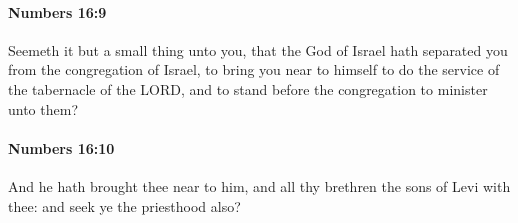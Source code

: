 		\paragraph{Numbers 16:9} %
			\label{NUMBERS-16-9}

			Seemeth it but a small thing unto you, that the God of Israel hath separated you from the congregation of Israel, to bring you near to himself to do the service of the tabernacle of the LORD, and to stand before the congregation to minister unto them?


		\paragraph{Numbers 16:10} %
			\label{NUMBERS-16-10}

			And he hath brought thee near to him, and all thy brethren the sons of Levi with thee: and seek ye the priesthood also?

